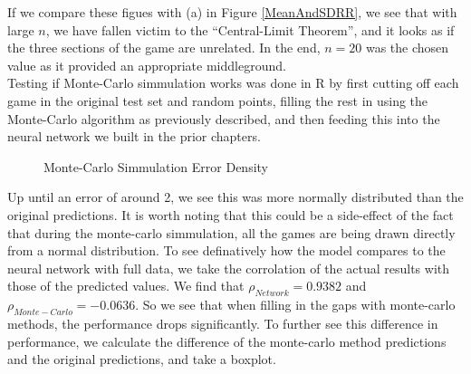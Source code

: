 If we compare these figues with (a) in Figure \ref{MeanAndSDRR}, we see that with large $n$, we have fallen victim to the ``Central-Limit Theorem'', and it looks as if the three 
sections of the game are unrelated. In the end, $n=20$ was the chosen value as it provided an appropriate middleground. \\

Testing if Monte-Carlo simmulation works was done in R by first cutting off each game in the original test set and random points, filling the rest in using the Monte-Carlo algorithm 
as previously described, and then feeding this into the neural network we built in the prior chapters. 

\begin{figure}[h]
    \centering
    \qquad
    \caption{Monte-Carlo Simmulation Error Density}
    \label{mcerror}
\end{figure}

Up until an error of around 2, we see this was more normally distributed than the original predictions. It is worth noting that this could be a side-effect of the fact that during the monte-carlo 
simmulation, all the games are being drawn directly from a normal distribution. To see definatively how the model compares to the neural network with full data, we take the corrolation of the actual results with those of the predicted values. 
We find that $\rho_{Network} = 0.9382$ and $\rho_{Monte-Carlo} = -0.0636$. So we see that when filling in the gaps with monte-carlo methods, the performance drops significantly. To further see this difference in performance, 
we calculate the difference of the monte-carlo method predictions and the original predictions, and take a boxplot.

